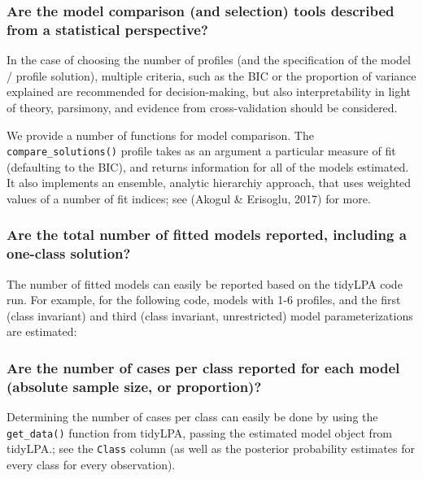 \documentclass[man]{apa6}
\begin{document}
\hypertarget{are-the-model-comparison-and-selection-tools-described-from-a-statistical-perspective}{%
\subsubsection{Are the model comparison (and selection) tools described from a statistical perspective?}\label{are-the-model-comparison-and-selection-tools-described-from-a-statistical-perspective}}

In the case of choosing the number of profiles (and the specification of the
model / profile solution), multiple criteria, such as the BIC or the proportion
of variance explained are recommended for decision-making, but also
interpretability in light of theory, parsimony, and evidence from
cross-validation should be considered.

We provide a number of functions for model comparison. The \texttt{compare\_solutions()} profile
takes as an argument a particular measure of fit (defaulting to the BIC), and returns information
for all of the models estimated. It also implements an ensemble, analytic hierarchiy approach, that uses weighted values of a number of fit indices; see (Akogul \& Erisoglu, 2017) for more.

\hypertarget{are-the-total-number-of-fitted-models-reported-including-a-one-class-solution}{%
\subsubsection{Are the total number of fitted models reported, including a one-class solution?}\label{are-the-total-number-of-fitted-models-reported-including-a-one-class-solution}}

The number of fitted models can easily be reported based on the tidyLPA code run. For example, for the following code, models with 1-6 profiles, and the first (class invariant) and third (class invariant, unrestricted) model parameterizations are estimated:

\hypertarget{are-the-number-of-cases-per-class-reported-for-each-model-absolute-sample-size-or-proportion}{%
\subsubsection{Are the number of cases per class reported for each model (absolute sample size, or proportion)?}\label{are-the-number-of-cases-per-class-reported-for-each-model-absolute-sample-size-or-proportion}}

Determining the number of cases per class can easily be done by using the \texttt{get\_data()} function from tidyLPA, passing the estimated model object from tidyLPA.; see the \texttt{Class} column (as well as the posterior probability estimates for every class for every observation).
\end{document}
